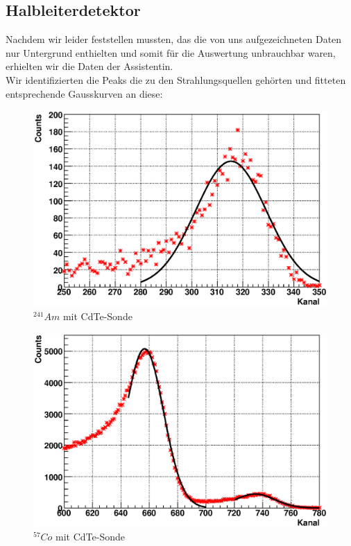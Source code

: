 \documentclass[12pt]{article}
\begin{document}
\subsection{Halbleiterdetektor}
Nachdem wir leider feststellen mussten, das die von uns aufgezeichneten Daten nur Untergrund enthielten und somit für die Auswertung unbrauchbar waren, erhielten wir die Daten der Assistentin.\\

Wir identifizierten die Peaks die zu den Strahlungsquellen gehörten und fitteten entsprechende Gausskurven an diese:

\begin{figure}[H]
\centering
\includegraphics[width=0.9\linewidth]{../plot/eps/gamma/cdte_am.eps}
\caption{$^{241}Am$ mit CdTe-Sonde}
\end{figure}

\begin{figure}[H]
\centering
\includegraphics[width=0.9\linewidth]{../plot/eps/gamma/cdte_co.eps}
\caption{$^{57}Co$ mit CdTe-Sonde}
\end{figure}
\end{document}
